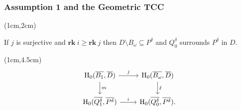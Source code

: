 \begin{frame}
  \frametitle{{\small Assumption 1 and the Geometric TCC}}

  \begin{textblock*}{11cm}(1cm,2cm)
    \begin{small}\begin{theorem}
        If $j$ is surjective and $\mathbf{rk}~i\geq \mathbf{rk}~j$ then $D\setminus B_\omega\subseteq P^\delta$ and $Q_0^\delta$ surrounds $P^\delta$ in $D$.
    \end{theorem}\end{small}
  \end{textblock*}

  \begin{textblock*}{11cm}(1cm,4.5cm)
    \[\begin{tikzcd}[ampersand replacement=\&]
      \hom_0(\overline{B_1},\overline{D})\arrow{d}{m} \arrow{r}{j} \&
      \hom_0(\overline{B_\omega}, \overline{D}) \arrow{d}{\ell} \\
      \hom_0(\overline{Q_1^\delta}, \overline{P^\delta}) \arrow{r}{i} \&
      \hom_0(\overline{Q_0^\delta}, \overline{P^\delta}).
    \end{tikzcd}\]
  \end{textblock*}
\end{frame}

%
%
%
